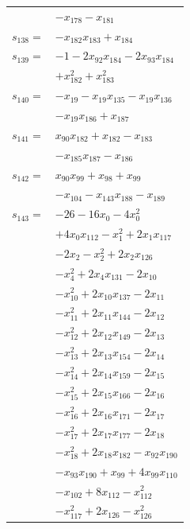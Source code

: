 \begin{longtable}{@{}r@{\;}l@{}}
 & \(\displaystyle -x_{178} -x_{181}\) \\[3pt]
\(s_{138}=\) & \(\displaystyle -x_{182}x_{183} +x_{184}\) \\[3pt]
\(s_{139}=\) & \(\displaystyle -1 -2x_{92}x_{184} -2x_{93}x_{184}\) \\
 & \(\displaystyle +x_{182}^{2} +x_{183}^{2}\) \\[3pt]
\(s_{140}=\) & \(\displaystyle -x_{19} -x_{19}x_{135} -x_{19}x_{136}\) \\
 & \(\displaystyle -x_{19}x_{186} +x_{187}\) \\[3pt]
\(s_{141}=\) & \(\displaystyle x_{90}x_{182} +x_{182} -x_{183}\) \\
 & \(\displaystyle -x_{185}x_{187} -x_{186}\) \\[3pt]
\(s_{142}=\) & \(\displaystyle x_{90}x_{99} +x_{98} +x_{99}\) \\
 & \(\displaystyle -x_{104} -x_{143}x_{188} -x_{189}\) \\[3pt]
\(s_{143}=\) & \(\displaystyle -26 -16x_{0} -4x_{0}^{2}\) \\
 & \(\displaystyle +4x_{0}x_{112} -x_{1}^{2} +2x_{1}x_{117}\) \\
 & \(\displaystyle -2x_{2} -x_{2}^{2} +2x_{2}x_{126}\) \\
 & \(\displaystyle -x_{4}^{2} +2x_{4}x_{131} -2x_{10}\) \\
 & \(\displaystyle -x_{10}^{2} +2x_{10}x_{137} -2x_{11}\) \\
 & \(\displaystyle -x_{11}^{2} +2x_{11}x_{144} -2x_{12}\) \\
 & \(\displaystyle -x_{12}^{2} +2x_{12}x_{149} -2x_{13}\) \\
 & \(\displaystyle -x_{13}^{2} +2x_{13}x_{154} -2x_{14}\) \\
 & \(\displaystyle -x_{14}^{2} +2x_{14}x_{159} -2x_{15}\) \\
 & \(\displaystyle -x_{15}^{2} +2x_{15}x_{166} -2x_{16}\) \\
 & \(\displaystyle -x_{16}^{2} +2x_{16}x_{171} -2x_{17}\) \\
 & \(\displaystyle -x_{17}^{2} +2x_{17}x_{177} -2x_{18}\) \\
 & \(\displaystyle -x_{18}^{2} +2x_{18}x_{182} -x_{92}x_{190}\) \\
 & \(\displaystyle -x_{93}x_{190} +x_{99} +4x_{99}x_{110}\) \\
 & \(\displaystyle -x_{102} +8x_{112} -x_{112}^{2}\) \\
 & \(\displaystyle -x_{117}^{2} +2x_{126} -x_{126}^{2}\) \\

\end{longtable}
